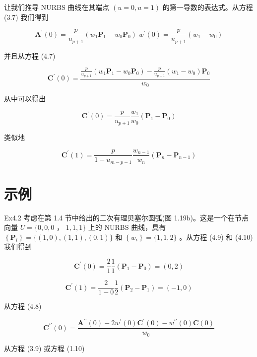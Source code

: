 \documentclass[../main.tex]{subfiles}
\begin{document}
让我们推导 NURBS 曲线在其端点 \(\left( {u = 0,u = 1}\right)\) 的第一导数的表达式。从方程 (3.7) 我们得到

\[
{\mathbf{A}}^{\prime }\left( 0\right)  = \frac{p}{{u}_{p + 1}}\left( {{w}_{1}{\mathbf{P}}_{1} - {w}_{0}{\mathbf{P}}_{0}}\right) \;{w}^{\prime }\left( 0\right)  = \frac{p}{{u}_{p + 1}}\left( {{w}_{1} - {w}_{0}}\right)
\]

并且从方程 (4.7)

\[
{\mathbf{C}}^{\prime }\left( 0\right)  = \frac{\frac{p}{{u}_{p + 1}}\left( {{w}_{1}{\mathbf{P}}_{1} - {w}_{0}{\mathbf{P}}_{0}}\right)  - \frac{p}{{u}_{p + 1}}\left( {{w}_{1} - {w}_{0}}\right) {\mathbf{P}}_{0}}{{w}_{0}}
\]

从中可以得出

\[
{\mathbf{C}}^{\prime }\left( 0\right)  = \frac{p}{{u}_{p + 1}}\frac{{w}_{1}}{{w}_{0}}\left( {{\mathbf{P}}_{1} - {\mathbf{P}}_{0}}\right)  \tag{4.9}
\]

类似地

\[
{\mathbf{C}}^{\prime }\left( 1\right)  = \frac{p}{1 - {u}_{m - p - 1}}\frac{{w}_{n - 1}}{{w}_{n}}\left( {{\mathbf{P}}_{n} - {\mathbf{P}}_{n - 1}}\right)  \tag{4.10}
\]

\section*{示例}

Ex4.2 考虑在第 1.4 节中给出的二次有理贝塞尔圆弧(图 1.19b)。这是一个在节点向量 \(U = \{ 0,0,0\) ， \(1,1,1\}\) 上的 NURBS 曲线，具有 \(\left\{  {\mathbf{P}}_{i}\right\}   = \{ \left( {1,0}\right) ,\left( {1,1}\right) ,\left( {0,1}\right) \}\) 和 \(\left\{  {w}_{i}\right\}   = \{ 1,1,2\}\) 。从方程 (4.9) 和 (4.10) 我们得到

\[
{\mathbf{C}}^{\prime }\left( 0\right)  = \frac{2}{1}\frac{1}{1}\left( {{\mathbf{P}}_{1} - {\mathbf{P}}_{0}}\right)  = \left( {0,2}\right)
\]

\[
{\mathbf{C}}^{\prime }\left( 1\right)  = \frac{2}{1 - 0}\frac{1}{2}\left( {{\mathbf{P}}_{2} - {\mathbf{P}}_{1}}\right)  = \left( {-1,0}\right)
\]

从方程 (4.8)

\[
{\mathbf{C}}^{\prime \prime }\left( 0\right)  = \frac{{\mathbf{A}}^{\prime \prime }\left( 0\right)  - 2{w}^{\prime }\left( 0\right) {\mathbf{C}}^{\prime }\left( 0\right)  - {w}^{\prime \prime }\left( 0\right) \mathbf{C}\left( 0\right) }{{w}_{0}}
\]

从方程 (3.9) 或方程 (1.10)
\end{document}
